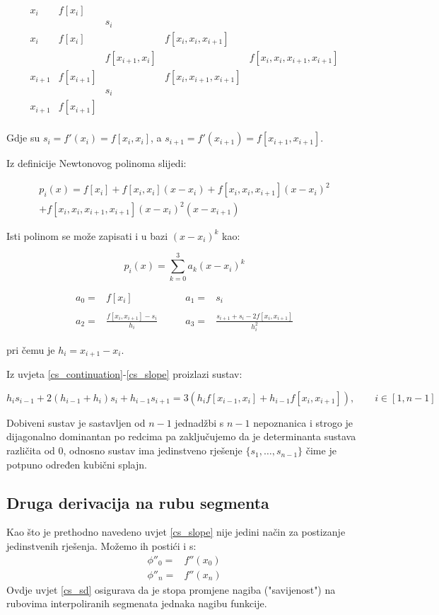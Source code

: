 $$
\begin{array}{ccccc}
    x_i & f[x_i]\\
    & & s_i\\
    x_i&f[x_i] & & f[x_i,x_i,x_{i+1}]\\
    & & f[x_{i+1},x_i] & & f[x_i,x_i,x_{i+1},x_{i+1}]\\
    x_{i+1} & f[x_{i+1}] & & f[x_i,x_{i+1},x_{i+1}]\\
    & & s_i\\
    x_{i+1} & f[x_{i+1}]\\
\end{array}
$$

Gdje su $s_i=f'(x_i)=f[x_i,x_i]$, a $s_{i+1}=f'(x_{i+1})=f[x_{i+1},x_{i+1}]$.

Iz definicije Newtonovog polinoma slijedi:

\begin{gather*}
p_i(x) = f[x_i]+f[x_i,x_i](x-x_i) + f[x_i,x_i,x_{i+1}](x-x_i)^2\\
+f[x_i,x_i,x_{i+1},x_{i+1}](x-x_i)^2(x-x_{i+1})
\end{gather*}

Isti polinom se može zapisati i u bazi $(x-x_i)^k$ kao:

$$
p_i(x)=\sum_{k=0}^3a_k(x-x_i)^k
$$

\begin{align*}
a_0=&f[x_i]&\qquad a_1=&s_i\\\\
a_2=&\frac{f[x_i,x_{i+1}]-s_i}{h_i}&\qquad a_3=&\frac{s_{i+1}+s_i-2f[x_i,x_{i+1}]}{h_i^2}
\end{align*}

pri čemu je $h_i=x_{i+1}-x_i$.

Iz uvjeta \ref{cs_continuation}-\ref{cs_slope} proizlazi sustav:

$$
h_is_{i-1}+2(h_{i-1}+h_i)s_i+h_{i-1}s_{i+1}=3(h_if[x_{i-1},x_i]+h_{i-1}f[x_i,x_{i+1}]),\qquad i\in[1,n-1]
$$

Dobiveni sustav je sastavljen od $n-1$ jednadžbi s $n-1$ nepoznanica i strogo je dijagonalno dominantan po redcima pa zaključujemo da je determinanta sustava različita od 0, odnosno sustav ima jedinstveno rješenje $\{s_1,\dots,s_{n-1}\}$ čime je potpuno određen kubični splajn.

\subsection{Druga derivacija na rubu segmenta}

\begin{conditionbox}
    Kao što je prethodno navedeno uvjet \ref{cs_slope} nije jedini način za postizanje jedinstvenih rješenja. Možemo ih postići i s:
    \begin{align}
        \phi''_0=&f''(x_0)\nonumber\\
        \label{cs_sd}
        \phi''_n=&f''(x_n)
    \end{align}
    Ovdje uvjet \ref{cs_sd} osigurava da je stopa promjene nagiba ("savijenost") na rubovima interpoliranih segmenata jednaka nagibu funkcije.
\end{conditionbox}

